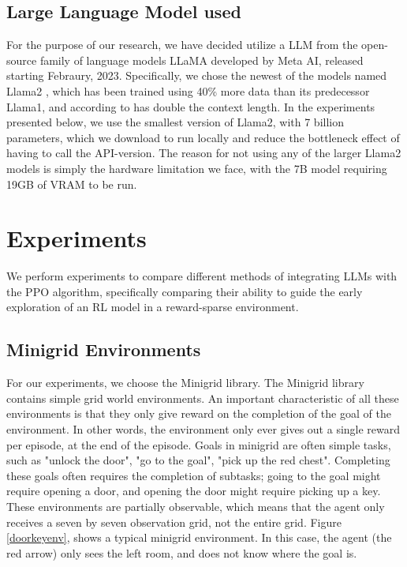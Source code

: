 \documentclass[conference]{IEEEtran}
\begin{document}
\subsection{Large Language Model used}

For the purpose of our research, we have decided utilize a LLM from the open-source family of language models LLaMA developed by Meta AI, released starting Febraury, 2023. Specifically, we chose the newest of the models named Llama2 \cite{llama}, which has been trained using 40\% more data than its predecessor Llama1, and according to \cite{meta} has double the context length. In the experiments presented below, we use the smallest version of Llama2, with 7 billion parameters, which we download to run locally and reduce the bottleneck effect of having to call the API-version. The reason for not using any of the larger Llama2 models is simply the hardware limitation we face, with the 7B model requiring 19GB of VRAM to be run.


\section{Experiments}

We perform experiments to compare different methods of integrating LLMs with the PPO algorithm, specifically comparing their ability to guide the early exploration of an RL model in a reward-sparse environment.

\subsection{Minigrid Environments}

For our experiments, we choose the Minigrid library. The Minigrid library contains simple grid world environments. An important characteristic of all these environments is that they only give reward on the completion of the goal of the environment. In other words, the environment only ever gives out a single reward per episode, at the end of the episode. Goals in minigrid are often simple tasks, such as "unlock the door", "go to the goal", "pick up the red chest". Completing these goals often requires the completion of subtasks; going to the goal might require opening a door, and opening the door might require picking up a key. These environments are partially observable, which means that the agent only receives a seven by seven observation grid, not the entire grid. Figure \ref{doorkeyenv}, shows a typical minigrid environment. In this case, the agent (the red arrow) only sees the left room, and does not know where the goal is.
\end{document}
